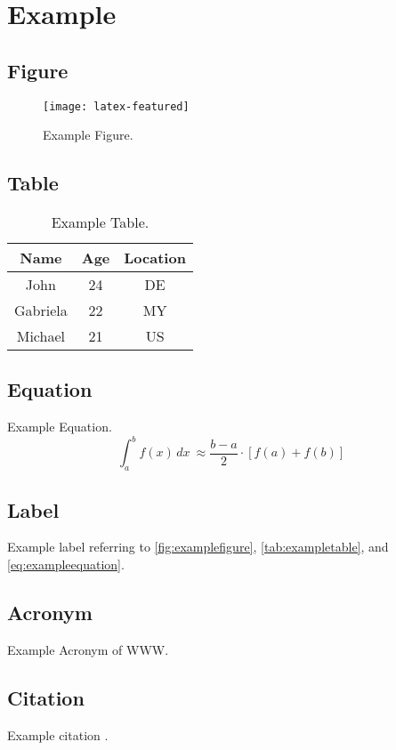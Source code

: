 \chapter{Example}

\section{Figure}

\begin{figure}
  \centering
  \texttt{[image: latex-featured]}
  \caption{Example Figure.}
  \label{fig:examplefigure}
\end{figure}

\section{Table}

\begin{table}
	\centering
	\caption{Example Table.}
	\label{tab:exampletable}
	\begin{tabular}{ccc}
		\toprule
		Name & Age & Location \\ \midrule
    John & 24 & DE \\
    Gabriela & 22 & MY \\
    Michael & 21 & US \\ \bottomrule
	\end{tabular}
\end{table}

\section{Equation}

Example Equation.
\begin{equation}
	\int_{a}^{b} f(x) \, dx\ \approx \frac{b - a}{2} \cdot [f(a) + f(b)]
	\label{eq:exampleequation}
\end{equation}

\section{Label}

Example label referring to \autoref{fig:examplefigure}, \autoref{tab:exampletable}, and \autoref{eq:exampleequation}.

\section{Acronym}
Example Acronym of \ac{WWW}.

\section{Citation}

Example citation \cite{shannon1949communication}.

